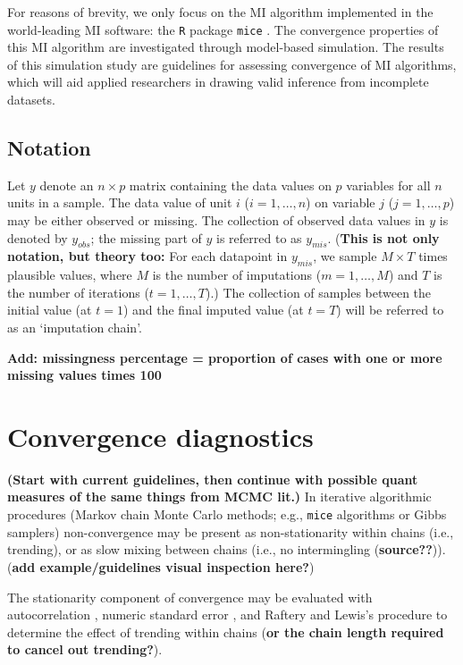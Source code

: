 \documentclass[Royal,times,sageh]{sagej}
\begin{document}
For reasons of brevity, we only focus on the MI algorithm implemented in
the world-leading MI software: the \texttt{R} \citep{R} package
\texttt{mice} \citep{mice}. The convergence properties of this MI
algorithm are investigated through model-based simulation. The results
of this simulation study are guidelines for assessing convergence of MI
algorithms, which will aid applied researchers in drawing valid
inference from incomplete datasets.

\hypertarget{notation}{%
\subsection{Notation}\label{notation}}

Let \(y\) denote an \(n \times p\) matrix containing the data values on
\(p\) variables for all \(n\) units in a sample. The data value of unit
\(i\) (\(i = 1, \dots, n\)) on variable \(j\) (\(j = 1, \dots, p\)) may
be either observed or missing. The collection of observed data values in
\(y\) is denoted by \(y_{obs}\); the missing part of \(y\) is referred
to as \(y_{mis}\). (\textbf{This is not only notation, but theory too:}
For each datapoint in \(y_{mis}\), we sample \(M \times T\) times
plausible values, where \(M\) is the number of imputations
(\(m = 1, \dots, M\)) and \(T\) is the number of iterations
(\(t = 1, \dots, T\)).) The collection of samples between the initial
value (at \(t=1\)) and the final imputed value (at \(t=T\)) will be
referred to as an `imputation chain'.

\textbf{Add: missingness percentage = proportion of cases with one or
more missing values times 100 }

\hypertarget{convergence-diagnostics}{%
\section{Convergence diagnostics}\label{convergence-diagnostics}}

\textbf{(Start with current guidelines, then continue with possible
quant measures of the same things from MCMC lit.)} In iterative
algorithmic procedures (Markov chain Monte Carlo methods; e.g.,
\texttt{mice} algorithms or Gibbs samplers) non-convergence may be
present as non-stationarity within chains (i.e., trending), or as slow
mixing between chains (i.e., no intermingling (\textbf{source??})).
(\textbf{add example/guidelines visual inspection here?})

The stationarity component of convergence may be evaluated with
autocorrelation \citep[\(AC\);][]{scha97, gelm13}, numeric standard
error \citep[or `MC error';][]{gewe92}, and Raftery and Lewis's
\citeyearpar{raft91} procedure to determine the effect of trending
within chains (\textbf{or the chain length required to cancel out
trending?}).
\end{document}
